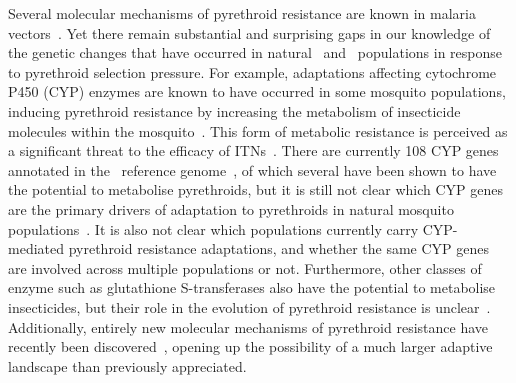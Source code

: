 \documentclass[a4paper,11pt,abstracton,hidelinks]{scrartcl}
\begin{document}
Several molecular mechanisms of pyrethroid resistance are known in malaria vectors~\parencite{Hemingway2016}.
%
Yet there remain substantial and surprising gaps in our knowledge of the genetic changes that have occurred in natural \agam\ and \acol\ populations in response to pyrethroid selection pressure.
%
For example, adaptations affecting cytochrome P450 (CYP) enzymes are known to have occurred in some mosquito populations, inducing pyrethroid resistance by increasing the metabolism of insecticide molecules within the mosquito~\parencite{Ranson2016,Hemingway2016}.
%
This form of metabolic resistance is perceived as a significant threat to the efficacy of ITNs~\parencite{Churcher2016,WHO2017PBOLLIN}.
%
There are currently 108 CYP genes annotated in the \agam\ reference genome~\parencite{GiraldoCalderon2015,AgamP4.12}, of which several have been shown to have the potential to metabolise pyrethroids, but it is still not clear which CYP genes are the primary drivers of adaptation to pyrethroids in natural mosquito populations~\parencite{Mohammed2017}.
%
It is also not clear which populations currently carry CYP-mediated pyrethroid resistance adaptations, and whether the same CYP genes are involved across multiple populations or not.
%
Furthermore, other classes of enzyme such as glutathione S-transferases also have the potential to metabolise insecticides, but their role in the evolution of pyrethroid resistance is unclear~\parencite{Adolfi2019}.
%
Additionally, entirely new molecular mechanisms of pyrethroid resistance have recently been discovered~\parencite{Ingham2020}, opening up the possibility of a much larger adaptive landscape than previously appreciated.
\end{document}
